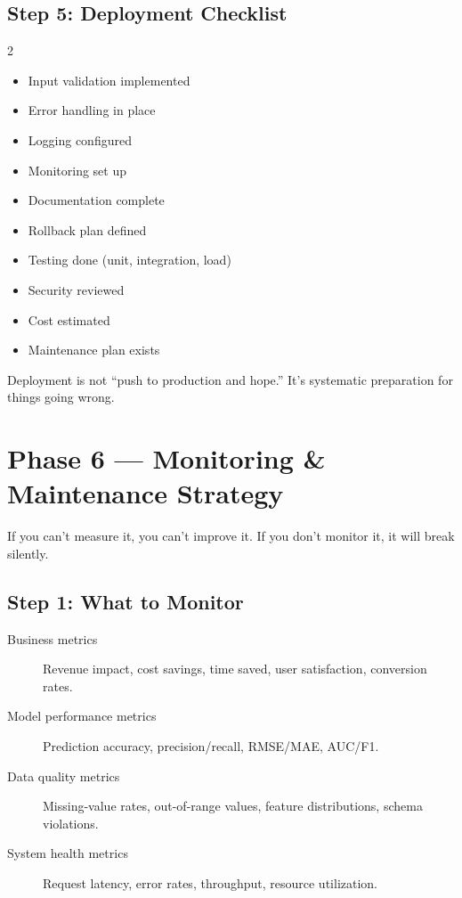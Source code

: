 \subsection{Step 5: Deployment Checklist}

\begin{multicols}{2}
\begin{itemize}[nosep]
  \item Input validation implemented
  \item Error handling in place
  \item Logging configured
  \item Monitoring set up
  \item Documentation complete
  \item Rollback plan defined
  \item Testing done (unit, integration, load)
  \item Security reviewed
  \item Cost estimated
  \item Maintenance plan exists
\end{itemize}
\end{multicols}

Deployment is not ``push to production and hope.'' It's systematic preparation for things going wrong.

\section{Phase 6 --- Monitoring \& Maintenance Strategy}

\begin{keytakeaway}
If you can't measure it, you can't improve it. If you don't monitor it, it will break silently.
\end{keytakeaway}

\subsection{Step 1: What to Monitor}

\begin{description}
  \item[Business metrics] Revenue impact, cost savings, time saved, user satisfaction, conversion rates.
  \item[Model performance metrics] Prediction accuracy, precision/recall, RMSE/MAE, AUC/F1.
  \item[Data quality metrics] Missing-value rates, out-of-range values, feature distributions, schema violations.
  \item[System health metrics] Request latency, error rates, throughput, resource utilization.
\end{description}


